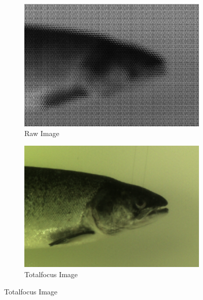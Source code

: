 \begin{figure}[h]
    \begin{subfigure}{0.49\textwidth}
        \includegraphics[width=\linewidth]{images/hardware/raytrix_raw_image}
        \caption{Raw Image} 
        \label{fig:raw_image}
    \end{subfigure}\hspace*{\fill}
    \begin{subfigure}{0.49\textwidth}
        \includegraphics[width=\linewidth]{images/hardware/raytrix_totalfocus_image}
        \caption{Totalfocus Image} 
        \label{fig:totalfocus}
    \end{subfigure}
    

\end{figure}
